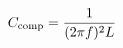 \documentclass[preview]{standalone}
\begin{document}
\begin{align*}
\special{dvisvgm:raw <g id='unique000'>}C_{\mathrm{comp}}=\frac{1}{(2\pi f)^2L}\special{dvisvgm:raw </g>}
\end{align*}
\end{document}
